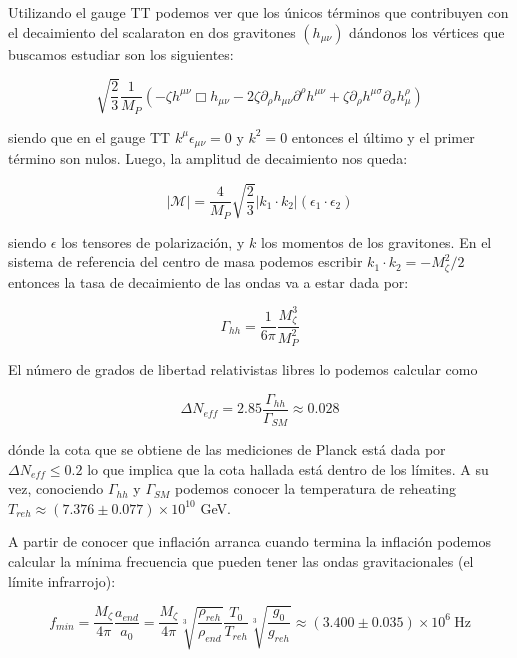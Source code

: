 Utilizando el gauge TT podemos ver que los únicos términos que contribuyen con el decaimiento del scalaraton en dos gravitones $(h_{\mu\nu})$ dándonos los vértices que buscamos estudiar son los siguientes:

\begin{equation}
    \sqrt{\frac{2}{3}} \frac{1}{M_P} \left( - \zeta h^{\mu \nu} \Box h_{\mu \nu} - 2 \zeta \partial_\rho h_{\mu \nu} \partial^\rho h^{\mu \nu} + \zeta \partial_\rho h^{\mu \sigma} \partial_\sigma h_ \mu^\rho \right)
\end{equation}

\noindent
siendo que en el gauge TT $k^\mu \epsilon_{\mu \nu} = 0$ y $k^2 = 0$ entonces el último y el primer término son nulos. Luego, la amplitud de decaimiento nos queda:

\begin{equation}
    \left| \mathcal{M} \right| = \frac{4}{M_P} \sqrt{\frac{2}{3}} \left| k_1 \cdot k_2 \right| \left( \epsilon_1 \cdot \epsilon_2 \right)
\end{equation}

\noindent
siendo $\epsilon$ los tensores de polarización, y $k$ los momentos de los gravitones. En el sistema de referencia del centro de masa podemos escribir $k_1 \cdot k_2 = - M^2_\zeta / 2$ entonces la tasa de decaimiento de las ondas va a estar dada por:

\begin{equation}
    \Gamma_{hh} = \frac{1}{6 \pi} \frac{M^3_\zeta}{M^2_P}
\end{equation}

El número de grados de libertad relativistas libres lo podemos calcular como

\begin{equation}
    \Delta N_{eff} = 2.85 \frac{\Gamma_{hh}}{\Gamma_{SM}} \approx 0.028
\end{equation}

\noindent
dónde la cota que se obtiene de las mediciones de Planck está dada por $\Delta N_{eff} \leq 0.2$ lo que implica que la cota hallada está dentro de los límites. A su vez, conociendo $\Gamma_{hh}$ y $\Gamma_{SM}$ podemos conocer la temperatura de reheating $T_{reh} \approx (7.376 \pm 0.077) \times 10^{10}$ GeV.

A partir de conocer que inflación arranca cuando termina la inflación podemos calcular la mínima frecuencia que pueden tener las ondas gravitacionales (el límite infrarrojo):

\begin{equation}
    f_{min} = \frac{M_\zeta}{4 \pi} \frac{a_{end}}{a_0} = \frac{M_\zeta}{4 \pi} \sqrt[3]{\frac{\rho_{reh}}{\rho_{end}}} \frac{T_0}{T_{reh}} \sqrt[3]{\frac{g_0}{g_{reh}}} \approx (3.400 \pm 0.035) \times 10^6 ~ \text{Hz}
\end{equation}

